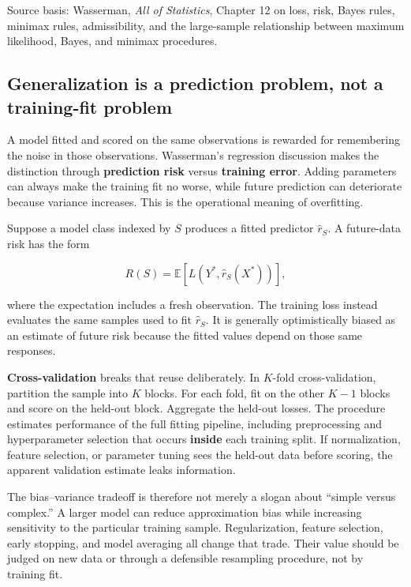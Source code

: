Source basis: Wasserman, \emph{All of Statistics}, Chapter 12 on loss, risk, Bayes rules, minimax rules, admissibility, and the large-sample relationship between maximum likelihood, Bayes, and minimax procedures.

\subsection{Generalization is a prediction problem, not a training-fit problem}\label{02-foundations-ii-ch030-generalization-is-a-prediction-problem-not-a-training-fit-problem}

A model fitted and scored on the same observations is rewarded for remembering the noise in those observations. Wasserman's regression discussion makes the distinction through \textbf{prediction risk} versus \textbf{training error}. Adding parameters can always make the training fit no worse, while future prediction can deteriorate because variance increases. This is the operational meaning of overfitting.

Suppose a model class indexed by \(S\) produces a fitted predictor \(\hat r_S\). A future-data risk has the form

\[
R(S)
=
\mathbb E[
L(Y^*,\hat r_S(X^*))
],
\]

where the expectation includes a fresh observation. The training loss instead evaluates the same samples used to fit \(\hat r_S\). It is generally optimistically biased as an estimate of future risk because the fitted values depend on those same responses.

\textbf{Cross-validation} breaks that reuse deliberately. In \(K\)-fold cross-validation, partition the sample into \(K\) blocks. For each fold, fit on the other \(K-1\) blocks and score on the held-out block. Aggregate the held-out losses. The procedure estimates performance of the full fitting pipeline, including preprocessing and hyperparameter selection that occurs \textbf{inside} each training split. If normalization, feature selection, or parameter tuning sees the held-out data before scoring, the apparent validation estimate leaks information.

The bias--variance tradeoff is therefore not merely a slogan about ``simple versus complex.'' A larger model can reduce approximation bias while increasing sensitivity to the particular training sample. Regularization, feature selection, early stopping, and model averaging all change that trade. Their value should be judged on new data or through a defensible resampling procedure, not by training fit.

